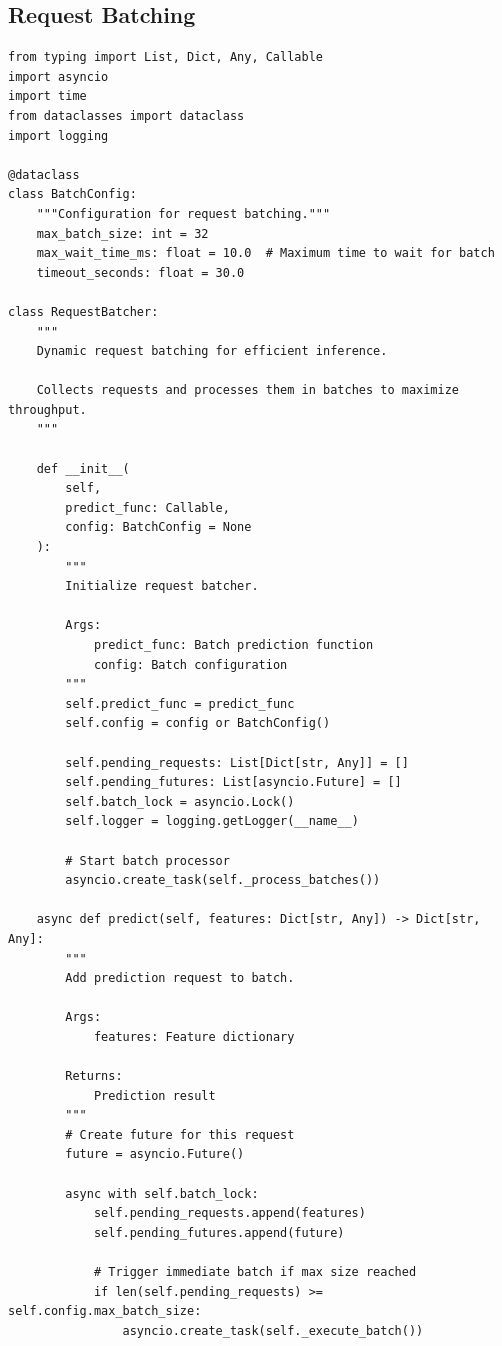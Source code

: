 \subsection{Request Batching}

\begin{lstlisting}[style=python, caption={Dynamic Request Batching}]
from typing import List, Dict, Any, Callable
import asyncio
import time
from dataclasses import dataclass
import logging

@dataclass
class BatchConfig:
    """Configuration for request batching."""
    max_batch_size: int = 32
    max_wait_time_ms: float = 10.0  # Maximum time to wait for batch
    timeout_seconds: float = 30.0

class RequestBatcher:
    """
    Dynamic request batching for efficient inference.

    Collects requests and processes them in batches to maximize throughput.
    """

    def __init__(
        self,
        predict_func: Callable,
        config: BatchConfig = None
    ):
        """
        Initialize request batcher.

        Args:
            predict_func: Batch prediction function
            config: Batch configuration
        """
        self.predict_func = predict_func
        self.config = config or BatchConfig()

        self.pending_requests: List[Dict[str, Any]] = []
        self.pending_futures: List[asyncio.Future] = []
        self.batch_lock = asyncio.Lock()
        self.logger = logging.getLogger(__name__)

        # Start batch processor
        asyncio.create_task(self._process_batches())

    async def predict(self, features: Dict[str, Any]) -> Dict[str, Any]:
        """
        Add prediction request to batch.

        Args:
            features: Feature dictionary

        Returns:
            Prediction result
        """
        # Create future for this request
        future = asyncio.Future()

        async with self.batch_lock:
            self.pending_requests.append(features)
            self.pending_futures.append(future)

            # Trigger immediate batch if max size reached
            if len(self.pending_requests) >= self.config.max_batch_size:
                asyncio.create_task(self._execute_batch())


\end{lstlisting}
